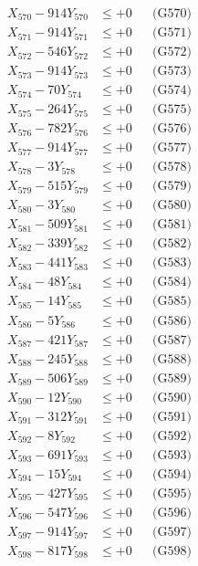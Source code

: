 \documentclass[a4paper,10pt]{article}
\begin{document}
{\begin{align}
X_{570} - 914Y_{570} &\leq +0 && \text{(G570)} \\
\allowbreak
X_{571} - 914Y_{571} &\leq +0 && \text{(G571)} \\
X_{572} - 546Y_{572} &\leq +0 && \text{(G572)} \\
X_{573} - 914Y_{573} &\leq +0 && \text{(G573)} \\
X_{574} - 70Y_{574} &\leq +0 && \text{(G574)} \\
X_{575} - 264Y_{575} &\leq +0 && \text{(G575)} \\
X_{576} - 782Y_{576} &\leq +0 && \text{(G576)} \\
X_{577} - 914Y_{577} &\leq +0 && \text{(G577)} \\
X_{578} - 3Y_{578} &\leq +0 && \text{(G578)} \\
X_{579} - 515Y_{579} &\leq +0 && \text{(G579)} \\
X_{580} - 3Y_{580} &\leq +0 && \text{(G580)} \\
\allowbreak
X_{581} - 509Y_{581} &\leq +0 && \text{(G581)} \\
X_{582} - 339Y_{582} &\leq +0 && \text{(G582)} \\
X_{583} - 441Y_{583} &\leq +0 && \text{(G583)} \\
X_{584} - 48Y_{584} &\leq +0 && \text{(G584)} \\
X_{585} - 14Y_{585} &\leq +0 && \text{(G585)} \\
X_{586} - 5Y_{586} &\leq +0 && \text{(G586)} \\
X_{587} - 421Y_{587} &\leq +0 && \text{(G587)} \\
X_{588} - 245Y_{588} &\leq +0 && \text{(G588)} \\
X_{589} - 506Y_{589} &\leq +0 && \text{(G589)} \\
X_{590} - 12Y_{590} &\leq +0 && \text{(G590)} \\
\allowbreak
X_{591} - 312Y_{591} &\leq +0 && \text{(G591)} \\
X_{592} - 8Y_{592} &\leq +0 && \text{(G592)} \\
X_{593} - 691Y_{593} &\leq +0 && \text{(G593)} \\
X_{594} - 15Y_{594} &\leq +0 && \text{(G594)} \\
X_{595} - 427Y_{595} &\leq +0 && \text{(G595)} \\
X_{596} - 547Y_{596} &\leq +0 && \text{(G596)} \\
X_{597} - 914Y_{597} &\leq +0 && \text{(G597)} \\
X_{598} - 817Y_{598} &\leq +0 && \text{(G598)} \\

\end{align}}
\end{document}
